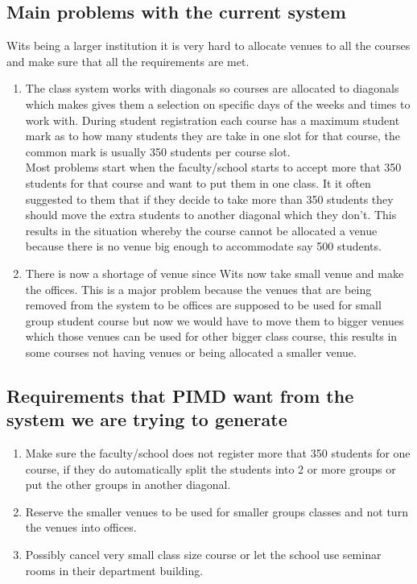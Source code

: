 \documentclass[11pt]{article}
\begin{document}
\subsection{Main problems with the current system}
Wits being a larger institution it is very hard to allocate venues to all the courses and make sure that all the requirements are met.\\
\begin{enumerate}[nosep, label=\textendash]
	\item The class system works with diagonals so courses are allocated to diagonals which makes gives them a selection on specific days of the weeks and times to work with. During student registration each course has a maximum student mark as to how many students they are take in one slot for that course, the common mark is usually 350 students per course slot.\\
	Most problems start when the faculty/school starts to accept more that 350 students for that course and want to put them in one class. It it often suggested to them that if they decide to take more than 350 students they should move the extra students to another diagonal which they don't. This results in the situation whereby the course cannot be allocated a venue because there is no venue big enough to accommodate say 500 students.\\
	\item There is now a shortage of venue since Wits now take small venue and make the offices. This is a major problem because the venues that are being removed from the system to be offices are supposed to be used for small group student course but now we would have to move them to bigger venues which those venues can be used for other bigger class course, this results in some courses not having venues or being allocated a smaller venue.
\end{enumerate}

\subsection{Requirements that PIMD want from the system we are trying to generate}
\begin{enumerate}[nosep, label=\textendash]
	\item Make sure the faculty/school does not register more that 350 students for one course, if they do automatically split the students into 2 or more groups or put the other groups in another diagonal.\\
	\item Reserve the smaller venues to be used for smaller groups classes and not turn the venues into offices.\\
	\item Possibly cancel very small class size course or let the school use seminar rooms in their department building.
\end{enumerate}
\end{document}
